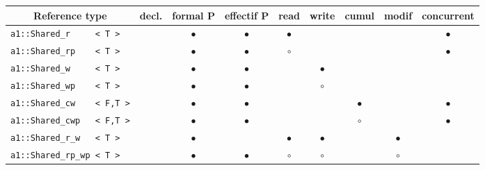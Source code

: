 \begin{figure}[htbp]
\begin{center}
\small
\begin{tabular}{|l|c|c|c|c|c|c|c|c|}
\hline
\multicolumn{1}{|c|}{Reference type}
 & decl. & formal P & effectif P & read & write & cumul & modif & concurrent
\\\hline
\begin{minipage}[c]{44mm}
\verb!a1::Shared_r     < T >!
\end{minipage}
 &           & $\bullet$ & $\bullet$ & $\bullet$ &           &           & & $\bullet$
\\\hline
\begin{minipage}[c]{44mm}
\verb!a1::Shared_rp    < T >!
\end{minipage}
 &           & $\bullet$ & $\bullet$ & $\circ$   &           &           & & $\bullet$
\\\hline
\begin{minipage}[c]{44mm}
\verb!a1::Shared_w     < T >!
\end{minipage}
 &           & $\bullet$ & $\bullet$ &           & $\bullet$ &           & &
\\\hline
\begin{minipage}[c]{44mm}
\verb!a1::Shared_wp    < T >!
\end{minipage}
 &           & $\bullet$ & $\bullet$ &           & $\circ$   &           & &
\\\hline
\begin{minipage}[c]{44mm}
\verb!a1::Shared_cw    < F,T >!
\end{minipage}
 &           & $\bullet$ & $\bullet$ &           &           & $\bullet$ & & $\bullet$
\\\hline
\begin{minipage}[c]{44mm}
\verb!a1::Shared_cwp   < F,T >!
\end{minipage}
 &           & $\bullet$ & $\bullet$ &           &           & $\circ$   & & $\bullet$
\\\hline
\begin{minipage}[c]{44mm}
\verb!a1::Shared_r_w   < T >!
\end{minipage}
 &           & $\bullet$ &           & $\bullet$ & $\bullet$ &           & $\bullet$ &
\\\hline
\begin{minipage}[c]{44mm}
\verb!a1::Shared_rp_wp < T >!
\end{minipage}
 &           & $\bullet$ & $\bullet$ & $\circ$   & $\circ$   &           & $\circ$   &

\end{tabular}
\end{center}
\end{figure}
